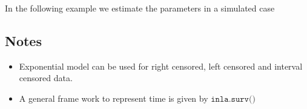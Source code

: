 \documentclass[a4paper,11pt]{article}
\begin{document}
In the following example we estimate the parameters in a simulated
case 

\subsection*{Notes}
\begin{itemize}
\item Exponential model can be used for right censored, left censored and interval censored data.\\
\item A general frame work to represent time is given by
    $\texttt{inla.surv()}$
\end{itemize}
\end{document}
